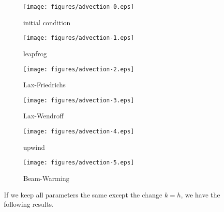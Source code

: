 \documentclass[twocolumn,10pt]{article}
\begin{document}
\vspace{-.3em}\begin{figure}[H]
    \centering
    \begin{minipage}[t]{0.48\linewidth}
        \centering
        \texttt{[image: figures/advection-0.eps]}
        \vspace{-.8em}
        \caption*{initial condition}
    \end{minipage}
    \begin{minipage}[t]{0.48\linewidth}
        \centering
        \texttt{[image: figures/advection-1.eps]}
        \vspace{-.8em}
        \caption*{leapfrog}
    \end{minipage}
    \begin{minipage}[t]{0.48\linewidth}
        \centering
        \vspace{1em}
        \texttt{[image: figures/advection-2.eps]}
        \vspace{-.8em}
        \caption*{Lax-Friedrichs}
    \end{minipage}
    \begin{minipage}[t]{0.48\linewidth}
        \centering
        \vspace{1em}
        \texttt{[image: figures/advection-3.eps]}
        \vspace{-.8em}
        \caption*{Lax-Wendroff}
    \end{minipage}
    \begin{minipage}[t]{0.48\linewidth}
        \centering
        \vspace{1em}
        \texttt{[image: figures/advection-4.eps]}
        \vspace{-.8em}
        \caption*{upwind}
    \end{minipage}
    \begin{minipage}[t]{0.48\linewidth}
        \centering
        \vspace{1em}
        \texttt{[image: figures/advection-5.eps]}
        \vspace{-.8em}
        \caption*{Beam-Warming}
    \end{minipage}
\end{figure} \vspace{-.5em}

If we keep all parameters the same except the change $k=h$, we have the following results.
\end{document}
